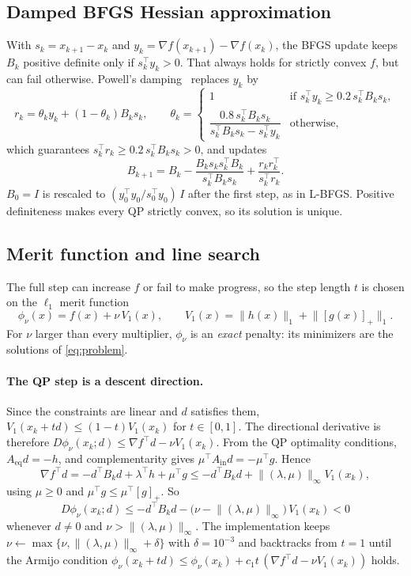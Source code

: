 \documentclass[11pt,a4paper]{article}
\newcommand{\Aeq}{A_{\mathrm{eq}}}
\newcommand{\Ain}{A_{\mathrm{in}}}
\newcommand{\norm}[1]{\lVert #1\rVert}
\newcommand{\pos}[1]{\left[#1\right]_+}
\begin{document}
\subsection{Damped BFGS Hessian approximation}
With $s_k=x_{k+1}-x_k$ and $y_k=\nabla f(x_{k+1})-\nabla f(x_k)$, the BFGS
update keeps $B_k$ positive definite only if $s_k^\top y_k>0$. That always
holds for strictly convex $f$, but can fail otherwise. Powell's damping~\cite{powell1978}
replaces $y_k$ by
\[
  r_k = \theta_k y_k + (1-\theta_k) B_k s_k,\qquad
  \theta_k = \begin{cases}
    1 & \text{if } s_k^\top y_k \ge 0.2\, s_k^\top B_k s_k,\\[2pt]
    \dfrac{0.8\, s_k^\top B_k s_k}{s_k^\top B_k s_k - s_k^\top y_k} & \text{otherwise,}
  \end{cases}
\]
which guarantees $s_k^\top r_k\ge 0.2\,s_k^\top B_k s_k>0$, and updates
\[
  B_{k+1} = B_k - \frac{B_k s_k s_k^\top B_k}{s_k^\top B_k s_k} + \frac{r_k r_k^\top}{s_k^\top r_k}.
\]
$B_0=I$ is rescaled to $(y_0^\top y_0/s_0^\top y_0)\,I$ after the first step, as in
L-BFGS. Positive definiteness makes every QP strictly convex, so its solution
is unique.

\subsection{Merit function and line search}
The full step can increase $f$ or fail to make progress, so the step length
$t$ is chosen on the $\ell_1$ merit function~\cite{han1977}
\[
  \phi_\nu(x) = f(x) + \nu\, V_1(x),\qquad
  V_1(x) = \norm{h(x)}_1 + \norm{\pos{g(x)}}_1 .
\]
For $\nu$ larger than every multiplier, $\phi_\nu$ is an \emph{exact} penalty:
its minimizers are the solutions of \eqref{eq:problem}.

\paragraph{The QP step is a descent direction.}
Since the constraints are linear and $d$ satisfies them,
$V_1(x_k+td)\le(1-t)V_1(x_k)$ for $t\in[0,1]$. The directional derivative is
therefore $D\phi_\nu(x_k;d)\le\nabla f^\top d-\nu V_1(x_k)$. From the QP
optimality conditions, $\Aeq d=-h$, and complementarity gives $\mu^\top\Ain d=-\mu^\top g$. Hence
\[
  \nabla f^\top d = -d^\top B_k d + \lambda^\top h + \mu^\top g
  \le -d^\top B_k d + \norm{(\lambda,\mu)}_\infty V_1(x_k),
\]
using $\mu\ge 0$ and $\mu^\top g\le\mu^\top\pos{g}$. So
\[
  D\phi_\nu(x_k;d) \le -d^\top B_k d - \big(\nu - \norm{(\lambda,\mu)}_\infty\big)\,V_1(x_k) < 0
\]
whenever $d\ne 0$ and $\nu>\norm{(\lambda,\mu)}_\infty$. The implementation keeps
$\nu\gets\max\{\nu,\norm{(\lambda,\mu)}_\infty+\delta\}$ with $\delta=10^{-3}$ and backtracks from $t=1$
until the Armijo condition
$\phi_\nu(x_k+td)\le\phi_\nu(x_k)+c_1 t\,(\nabla f^\top d-\nu V_1(x_k))$ holds.
\end{document}

